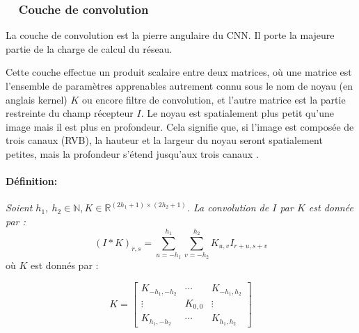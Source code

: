 	
	
	\subsubsection{\qquad \textbullet \ \ Couche de convolution}
	
	La couche de convolution est la pierre angulaire du CNN. Il porte la majeure partie de la charge de calcul du réseau.
	
	Cette couche effectue un produit scalaire entre deux matrices, où une matrice est l'ensemble de paramètres apprenables autrement connu sous le nom de noyau (en anglais kernel) $K$ ou encore filtre de convolution, et l'autre matrice est la partie restreinte du champ récepteur $I$. Le noyau est spatialement plus petit qu'une image mais il est plus en profondeur. Cela signifie que, si l'image est composée de trois canaux (RVB), la hauteur et la largeur du noyau seront spatialement petites, mais la profondeur s'étend jusqu'aux trois canaux \cite{goodfellow2016deep}.
	
	\paragraph*{Définition:}
	
	\textit{Soient $h_1, \ h_2 \in \mathbb{N}, {K} \in \mathbb{R}^{(2h_1+1)\times(2h_2+1)}$. 
	La convolution de $I$ par $K$ est donnée par :} 
	\begin{equation} \label{eq:kernel}
		(I\ast K)_{r,s} = \sum_{u=-h_1}^{h_1} \sum_{v=-h_2}^{h_2} K_{u,v}I_{r+u,s+v}
	\end{equation} 
	où $K$ est donnés par : 
	
	$$ 
	K = \begin{bmatrix}
		{K_{-h_1,-h_2}}&\cdots &{K_{-h_1,h_2}}\\
		\vdots &{K_{0,0}} &\vdots \\
		{K_{h_1,-h_2}}&\cdots &{K_{h_1,h_2}}
	\end{bmatrix}
	$$
	
